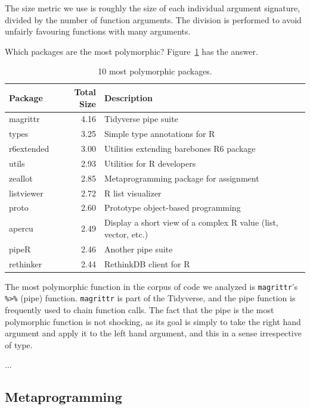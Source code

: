 \documentclass[acmsmall,10pt,review,anonymous]{acmart}\settopmatter{printfolios=true,printccs=false,printacmref=false}
\begin{document}
The size metric we use is roughly the size of each individual argument signature, divided by the number of function arguments.
The division is performed to avoid unfairly favouring functions with many arguments.

Which packages are the most polymorphic?
Figure~\ref{tab:packagepolysize} has the answer.

\begin{table}[ht]
\label{tab:packagepolysize}
\centering
\begin{tabular}{lrl}
  \hline
Package & Total Size & Description \\ 
  \hline
  magrittr & 4.16 & Tidyverse pipe suite \\ 
  types & 3.25 & Simple type annotations for R \\ 
  r6extended & 3.00 & Utilities extending barebones R6 package \\ 
  utils & 2.93 & Utilities for R developers \\ 
  zeallot & 2.85 & Metaprogramming package for assignment \\ 
  listviewer & 2.72 & R list visualizer \\ 
  proto & 2.60 & Prototype object-based programming \\ 
  apercu & 2.49 & Display a short view of a complex R value (list, vector, etc.) \\ 
  pipeR & 2.46 & Another pipe suite \\ 
  rethinker & 2.44 & RethinkDB client for R \\ 
   \hline
\end{tabular}
\caption{10 most polymorphic packages.}
\end{table}




The most polymorphic function in the corpus of code we analyzed is {\tt magrittr}'s {\tt \%>\%} (pipe) function.
{\tt magrittr} is part of the Tidyverse, and the pipe function is frequently used to chain function calls.
The fact that the pipe is the most polymorphic function is not shocking, as its goal is simply to take the right hand argument and apply it to the left hand argument, and this in a sense irrespective of type.

...

%
%
%
%
\subsection{Metaprogramming}
\end{document}
